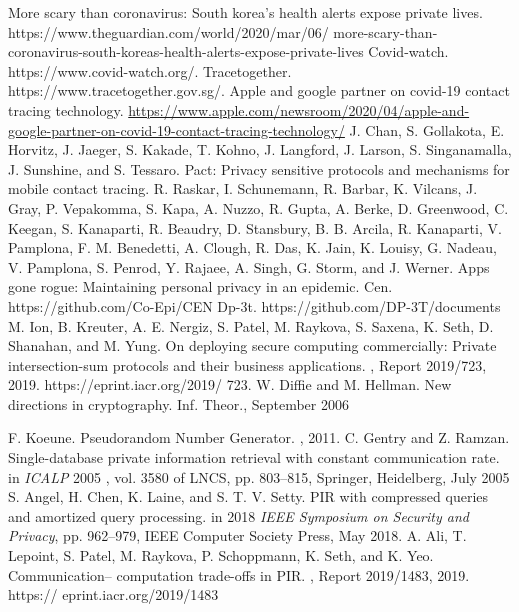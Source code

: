 \begin{thebibliography}{10}
\begin{small}
 More scary than coronavirus: South korea’s health alerts expose private lives. \newblock https://www.theguardian.com/world/2020/mar/06/
more-scary-than-coronavirus-south-koreas-health-alerts-expose-private-lives
 Covid-watch. \newblock  https://www.covid-watch.org/.
 Tracetogether. \newblock  https://www.tracetogether.gov.sg/.
 Apple and google partner on covid-19 contact tracing technology. \newblock  \url{https://www.apple.com/newsroom/2020/04/apple-and-google-partner-on-covid-19-contact-tracing-technology/}
 J. Chan, S. Gollakota, E. Horvitz, J. Jaeger, S. Kakade, T. Kohno, J. Langford, J. Larson, S. Singanamalla,
J. Sunshine, and S. Tessaro. \newblock Pact: Privacy sensitive protocols and mechanisms for mobile contact tracing. 
  R. Raskar, I. Schunemann, R. Barbar, K. Vilcans, J. Gray, P. Vepakomma, S. Kapa, A. Nuzzo, R. Gupta,
A. Berke, D. Greenwood, C. Keegan, S. Kanaparti, R. Beaudry, D. Stansbury, B. B. Arcila, R. Kanaparti,
V. Pamplona, F. M. Benedetti, A. Clough, R. Das, K. Jain, K. Louisy, G. Nadeau, V. Pamplona, S. Penrod,
Y. Rajaee, A. Singh, G. Storm, and J. Werner. \newblock Apps gone rogue: Maintaining personal privacy in an
epidemic. 
 Cen. \newblock https://github.com/Co-Epi/CEN
 Dp-3t. \newblock https://github.com/DP-3T/documents
 M. Ion, B. Kreuter, A. E. Nergiz, S. Patel, M. Raykova, S. Saxena, K. Seth, D. Shanahan, and M. Yung. \newblock On
deploying secure computing commercially: Private intersection-sum protocols and their business applications. , Report 2019/723, 2019. https://eprint.iacr.org/2019/
723.
 W. Diffie and M. Hellman.  \newblock New directions in cryptography.    Inf. Theor., September 2006

 F. Koeune. \newblock Pseudorandom Number Generator. , 2011.
  C. Gentry and Z. Ramzan. \newblock Single-database private information retrieval with constant communication
rate. \newblock in {\em ICALP} 2005 , vol. 3580
of LNCS, pp. 803–815, Springer, Heidelberg, July 2005
  S. Angel, H. Chen, K. Laine, and S. T. V. Setty. \newblock PIR with compressed queries and amortized query
processing. \newblock in 2018 {\em IEEE Symposium on Security and Privacy}, pp. 962–979, IEEE Computer Society
Press, May 2018.
 A. Ali, T. Lepoint, S. Patel, M. Raykova, P. Schoppmann, K. Seth, and K. Yeo. \newblock Communication–
computation trade-offs in PIR. , Report 2019/1483, 2019. https://
eprint.iacr.org/2019/1483


\end{small}
\end{thebibliography}
